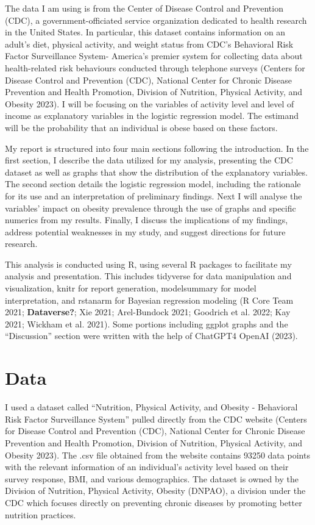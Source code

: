 \documentclass[
  letterpaper,
  DIV=11,
  numbers=noendperiod]{scrartcl}
\begin{document}
The data I am using is from the Center of Disease Control and Prevention
(CDC), a government-officiated service organization dedicated to health
research in the United States. In particular, this dataset contains
information on an adult's diet, physical activity, and weight status
from CDC's Behavioral Risk Factor Surveillance System- America's premier
system for collecting data about health-related risk behaviours
conducted through telephone surveys (Centers for Disease Control and
Prevention (CDC), National Center for Chronic Disease Prevention and
Health Promotion, Division of Nutrition, Physical Activity, and Obesity
2023). I will be focusing on the variables of activity level and level
of income as explanatory variables in the logistic regression model. The
estimand will be the probability that an individual is obese based on
these factors.

My report is structured into four main sections following the
introduction. In the first section, I describe the data utilized for my
analysis, presenting the CDC dataset as well as graphs that show the
distribution of the explanatory variables. The second section details
the logistic regression model, including the rationale for its use and
an interpretation of preliminary findings. Next I will analyse the
variables' impact on obesity prevalence through the use of graphs and
specific numerics from my results. Finally, I discuss the implications
of my findings, address potential weaknesses in my study, and suggest
directions for future research.

This analysis is conducted using R, using several R packages to
facilitate my analysis and presentation. This includes tidyverse for
data manipulation and visualization, knitr for report generation,
modelsummary for model interpretation, and rstanarm for Bayesian
regression modeling (R Core Team 2021; \textbf{Dataverse?}; Xie 2021;
Arel-Bundock 2021; Goodrich et al. 2022; Kay 2021; Wickham et al. 2021).
Some portions including ggplot graphs and the ``Discussion'' section
were written with the help of ChatGPT4 OpenAI (2023). \newpage

\hypertarget{data}{%
\section{Data}\label{data}}

I used a dataset called ``Nutrition, Physical Activity, and Obesity -
Behavioral Risk Factor Surveillance System'' pulled directly from the
CDC website (Centers for Disease Control and Prevention (CDC), National
Center for Chronic Disease Prevention and Health Promotion, Division of
Nutrition, Physical Activity, and Obesity 2023). The .csv file obtained
from the website contains 93250 data points with the relevant
information of an individual's activity level based on their survey
response, BMI, and various demographics. The dataset is owned by the
Division of Nutrition, Physical Activity, Obesity (DNPAO), a division
under the CDC which focuses directly on preventing chronic diseases by
promoting better nutrition practices.
\end{document}
